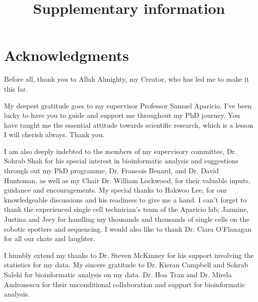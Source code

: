 

\makeatletter
\newcommand{\putFigLargCap}[5]
{
\begin{center}
\texttt{[image: \#1]}   
\bigskip
\setbox0\vbox{
\let\caption@rule\relax
\captionof{figure}[#5]{\textbf{#5} #3 \label{#4}}
\global\skip1\lastskip\unskip
\global\setbox1\lastbox

}
\unvbox0
\setbox0\hbox{\unhbox1\unskip\unskip\unpenalty
\global\setbox1\lastbox}
\unvbox1
\vskip\skip1
\end{center}
}
\makeatother





\title{Supplementary information}















\chapter{Acknowledgments}

Before all, thank you to Allah Almighty, my Creator, who has led me to make it this far.

My deepest gratitude goes to my supervisor Professor Samuel Aparicio. I've been lucky to have you to guide and support me throughout my PhD journey. You have taught me the essential attitude towards scientific research, which is a lesson I will cherish always. Thank you.

I am also deeply indebted to the members of my supervisory committee, Dr. Sohrab Shah for his special interest in bioinformatic analysis and suggestions through out my PhD programme, Dr. Francois Benard, and Dr. David Huntsman, as well as my Chair Dr. William Lockwood, for their valuable inputs, guidance and encouragements. My special thanks to Hakwoo Lee, for our knowledgeable discussions and his readiness to give me a hand. I can't forget to thank the experienced single cell technician's team of the Aparicio lab; Jazmine, Justina and Jecy for handling my thousands and thousands of single cells on the robotic spotters and sequencing. I would also like to thank Dr. Ciara O'Flanagan for all our chats and laughter. 

I humbly extend my thanks to Dr. Steven McKinney for his support involving the statistics for my data. My sincere gratitude to Dr. Kieran Campbell and Sohrab Salehi for bioinformatic analysis on my data. Dr. Hoa Tran and Dr. Mirela Andronescu for their unconditional collaboration and support for bioinformatic analysis. 


